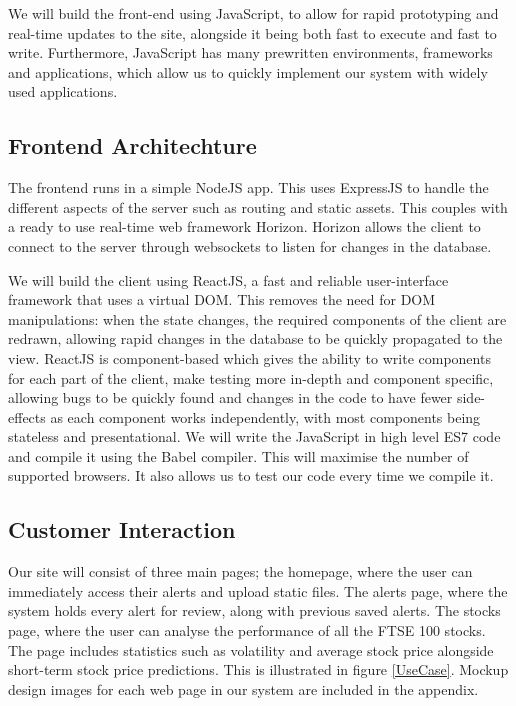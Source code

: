 \documentclass[11pt, oneside, a4paper]{article}
\begin{document}
We will build the front-end using JavaScript, to allow for rapid prototyping and
real-time updates to the site, alongside it being both fast to execute and fast
to write. Furthermore, JavaScript has many prewritten environments, frameworks
and applications, which allow us to quickly implement our system with widely used
applications.

\subsection{Frontend Architechture}
The frontend runs in a simple NodeJS app. This uses ExpressJS to handle the
different aspects of the server such as routing and static assets. This couples
with a ready to use real-time web framework Horizon. Horizon allows the client to
connect to the server through websockets to listen for changes in the database.

We will build the client using ReactJS, a fast and reliable user-interface framework
that uses a virtual DOM. This removes the need for DOM manipulations: when the state
changes, the required components of the client are redrawn, allowing rapid changes in
the database to be quickly propagated to the view. ReactJS is component-based which
gives the ability to write components for each part of the client, make testing more
in-depth and component specific, allowing bugs to be quickly found and changes in
the code to have fewer side-effects as each component works independently, with most
components being stateless and presentational. We will write the JavaScript in high
level ES7 code and compile it using the Babel compiler. This will maximise the number
of supported browsers. It also allows us to test our code every time we compile it.

\subsection{Customer Interaction}
Our site will consist of three main pages; the homepage, where the user can immediately
access their alerts and upload static files. The alerts page, where the system holds
every alert for review, along with previous saved alerts. The stocks page, where
the user can analyse the performance of all the FTSE 100 stocks. The page includes
statistics such as volatility and average stock price alongside short-term stock
price predictions. This is illustrated in figure \ref{UseCase}. Mockup design images
for each web page in our system are included in the appendix.
\end{document}
